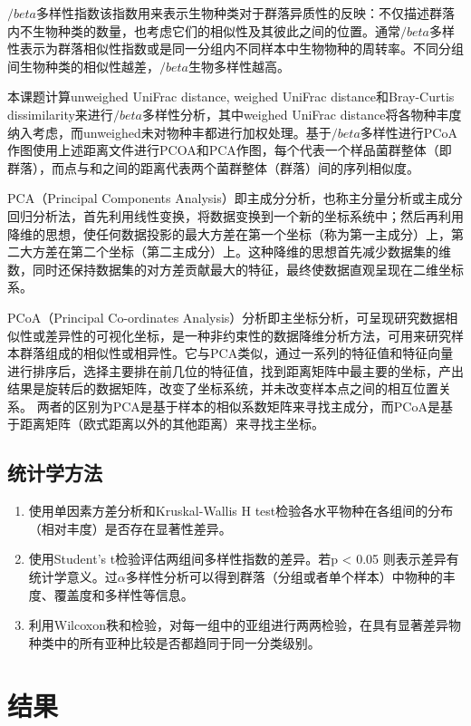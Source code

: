     $/beta$多样性指数该指数用来表示生物种类对于群落异质性的反映：不仅描述群落内不生物种类的数量，也考虑它们的相似性及其彼此之间的位置。通常$/beta$多样性表示为群落相似性指数或是同一分组内不同样本中生物物种的周转率。不同分组间生物种类的相似性越差，$/beta$生物多样性越高。

    本课题计算unweighed UniFrac distance, weighed UniFrac distance和Bray-Curtis dissimilarity来进行$/beta$多样性分析，其中weighed UniFrac distance将各物种丰度纳入考虑，而unweighed未对物种丰都进行加权处理。基于$/beta$多样性进行PCoA作图使用上述距离文件进行PCOA和PCA作图，每个代表一个样品菌群整体（即群落），而点与和之间的距离代表两个菌群整体（群落）间的序列相似度。

    PCA（Principal Components Analysis）即主成分分析，也称主分量分析或主成分回归分析法，首先利用线性变换，将数据变换到一个新的坐标系统中；然后再利用降维的思想，使任何数据投影的最大方差在第一个坐标（称为第一主成分）上，第二大方差在第二个坐标（第二主成分）上。这种降维的思想首先减少数据集的维数，同时还保持数据集的对方差贡献最大的特征，最终使数据直观呈现在二维坐标系。

    PCoA（Principal Co-ordinates Analysis）分析即主坐标分析，可呈现研究数据相似性或差异性的可视化坐标，是一种非约束性的数据降维分析方法，可用来研究样本群落组成的相似性或相异性。它与PCA类似，通过一系列的特征值和特征向量进行排序后，选择主要排在前几位的特征值，找到距离矩阵中最主要的坐标，产出结果是旋转后的数据矩阵，改变了坐标系统，并未改变样本点之间的相互位置关系。
    两者的区别为PCA是基于样本的相似系数矩阵来寻找主成分，而PCoA是基于距离矩阵（欧式距离以外的其他距离）来寻找主坐标。

  \subsection{统计学方法}
  \label{统计学方法}
    \begin{enumerate}
      \item 使用单因素方差分析和Kruskal-Wallis H test检验各水平物种在各组间的分布（相对丰度）是否存在显著性差异。
      \item 使用Student’s t检验评估两组间多样性指数的差异。若p < 0.05 则表示差异有统计学意义。过$\alpha$多样性分析可以得到群落（分组或者单个样本）中物种的丰度、覆盖度和多样性等信息。
      \item 利用Wilcoxon秩和检验，对每一组中的亚组进行两两检验，在具有显著差异物种类中的所有亚种比较是否都趋同于同一分类级别。
    \end{enumerate}

\section{结果}
